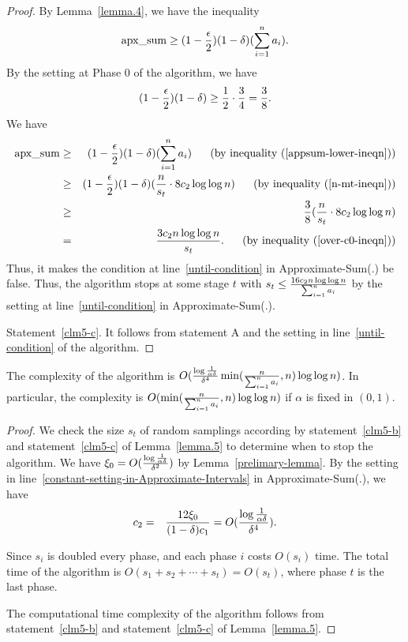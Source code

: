 \documentclass[runningheads]{llncs}
\newcommand{\appsum}{{\rm apx\_sum}}
\begin{document}
\begin{proof}
By Lemma~\ref{lemma.4}, we have the inequality
\begin{eqnarray}
\appsum\ge (1-{\epsilon\over
2})(1-\delta)(\sum_{i=1}^na_i).\label{appsum-lower-ineqn}
\end{eqnarray}
By the setting at Phase 0 of the algorithm, we have
\begin{eqnarray}
(1-{\epsilon\over 2})(1-\delta)\ge {1\over 2}\cdot {3\over 4}=
{3\over 8}.\label{over-c0-ineqn}
\end{eqnarray}
We have
\begin{eqnarray}
 \appsum&\ge&(1-{\epsilon\over 2})(1-\delta)(\sum_{i=1}^na_i)\ \ \ \ \ \mbox{(by\ inequality~(\ref{appsum-lower-ineqn}))}\\
 &\ge&(1-{\epsilon\over 2})(1-\delta)({n\over s_t}\cdot 8c_2\log\log n)\ \ \ \ \ \mbox{(by\ inequality~(\ref{n-mt-ineqn}))}\\
&\ge&{3\over 8}({n\over s_t}\cdot 8c_2\log\log
n)\\
 &=& {3c_2n\log\log n\over s_t}. \ \ \ \ \ \mbox{(by\
 inequality~(\ref{over-c0-ineqn}))}
\end{eqnarray}
Thus, it makes the condition at line~\ref{until-condition} in
Approximate-Sum(.) be false. Thus, the algorithm stops at some stage
$t$ with $s_t\le {16 c_2n\log\log n\over \sum_{i=1}^n a_i}$ by the
setting at line~\ref{until-condition} in Approximate-Sum(.).

 Statement~\ref{clm5-c}. It follows from statement A and the
setting in line~\ref{until-condition} of the algorithm.
\end{proof}


\begin{lemma}\label{lemma.6}
The complexity of the algorithm is $O({\log {1\over
\alpha\delta}\over \delta^4}\min({n\over \sum_{i=1}^n
a_i},n)\log\log n)$. In particular, the complexity is
$O(\min({n\over \sum_{i=1}^n a_i},n)\log\log n)$ if $\alpha$
 is fixed in $(0,1)$.
\end{lemma}


\begin{proof} We check the size $s_t$ of random samplings according by statement~\ref{clm5-b} and statement~\ref{clm5-c} of
Lemma~\ref{lemma.5} to determine when to stop the algorithm. We have
$\xi_0=O({\log {1\over \alpha\delta}\over \delta^2})$ by
Lemma~\ref{prelimary-lemma}. By the setting in
line~\ref{constant-setting-in-Approximate-Intervals} in
Approximate-Sum(.), we have
\begin{eqnarray*}
c_2&=& {12\xi_0\over (1-\delta)c_1} =O({\log {1\over
\alpha\delta}\over \delta^4}).
\end{eqnarray*}


 Since $s_i$ is doubled every phase,
and each  phase $i$ costs $O(s_i)$ time. The total time of the
algorithm is $O(s_1+s_2+\cdots +s_t)=O(s_t)$, where phase $t$ is the
last phase.


 The computational time complexity
   of the algorithm follows from statement~\ref{clm5-b} and statement~\ref{clm5-c} of
Lemma~\ref{lemma.5}.
\end{proof}
\end{document}
